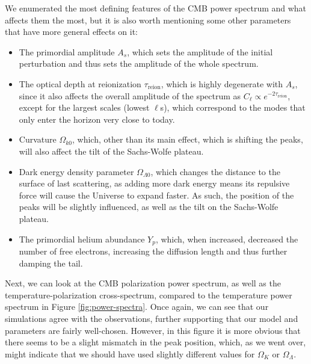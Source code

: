 \documentclass{aa}
\begin{document}
We enumerated the most defining features of the CMB power spectrum and what affects them the most, but it is also worth mentioning some other parameters that have more general effects on it:
\begin{itemize}
    \item The primordial amplitude $A_s$, which sets the amplitude of the initial perturbation and thus sets the amplitude of the whole spectrum.
    \item The optical depth at reionization $\tau_\text{reion}$, which is highly degenerate with $A_s$, since it also affects the overall amplitude of the spectrum as $C_\ell \propto e^{-2\tau_\text{reion}}$, except for the largest scales (lowest $\ell$s), which correspond to the modes that only enter the horizon very close to today.
    \item Curvature $\Omega_{k0}$, which, other than its main effect, which is shifting the peaks, will also affect the tilt of the Sachs-Wolfe plateau.
    \item Dark energy density parameter $\Omega_{\Lambda0}$, which changes the distance to the surface of last scattering, as adding more dark energy means its repulsive force will cause the Universe to expand faster. As such, the position of the peaks will be slightly influenced, as well as the tilt on the Sachs-Wolfe plateau.
    \item The primordial helium abundance $Y_p$, which, when increased, decreased the number of free electrons, increasing the diffusion length and thus further damping the tail.
\end{itemize}

Next, we can look at the CMB polarization power spectrum, as well as the temperature-polarization cross-spectrum, compared to the temperature power spectrum in Figure \ref{fig:power-spectra}. Once again, we can see that our simulations agree with the observations, further supporting that our model and parameters are fairly well-chosen. However, in this figure it is more obvious that there seems to be a slight mismatch in the peak position, which, as we went over, might indicate that we should have used slightly different values for $\Omega_{K}$ or $\Omega_\Lambda$.
\end{document}
